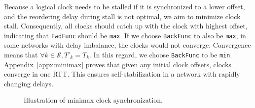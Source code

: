Because a logical clock needs to be stalled if it is synchronized to a lower offset, and the reordering delay during stall is not optimal, we aim to minimize clock stall. Consequently, all clocks should catch up with the clock with highest offset, indicating that \texttt{FwdFunc} should be \texttt{max}. If we choose \texttt{BackFunc} to also be \texttt{max}, in some networks with delay imbalance, the clocks would not converge. Convergence means that $\forall k \in \mathcal{S}, T'_k = T_k$. In this regard, we choose \texttt{BackFunc} to be \texttt{min}. Appendix~\ref{appx:minimax} proves that given any initial clock offsets, clocks converge in one RTT. This ensures self-stabilization in a network with rapidly changing delays.


\begin{figure}[t]
\centering

\caption{Illustration of minimax clock synchronization.}
\label{fig:minimax}
\vspace{-1.2em}
\end{figure}



